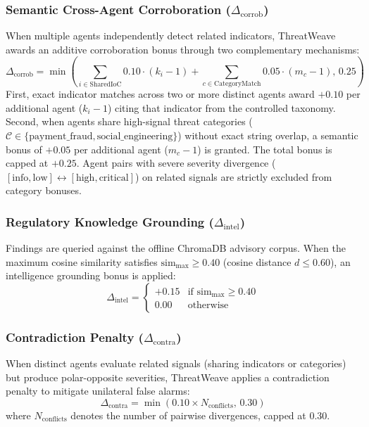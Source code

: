\documentclass[conference]{IEEEtran}
\begin{document}
\subsubsection{Semantic Cross-Agent Corroboration ($\Delta_{\text{corrob}}$)}
When multiple agents independently detect related indicators, ThreatWeave awards an additive corroboration bonus through two complementary mechanisms:
\begin{equation}
\Delta_{\text{corrob}} = \min\left( \sum_{i \in \text{SharedIoC}} 0.10 \cdot (k_i - 1) + \sum_{c \in \text{CategoryMatch}} 0.05 \cdot (m_c - 1), \, 0.25 \right)
\end{equation}
First, exact indicator matches across two or more distinct agents award $+0.10$ per additional agent ($k_i - 1$) citing that indicator from the controlled taxonomy. Second, when agents share high-signal threat categories ($\mathcal{C} \in \{\text{payment\_fraud}, \text{social\_engineering}\}$) without exact string overlap, a semantic bonus of $+0.05$ per additional agent ($m_c - 1$) is granted. The total bonus is capped at $+0.25$. Agent pairs with severe severity divergence ($[\text{info}, \text{low}] \leftrightarrow [\text{high}, \text{critical}]$) on related signals are strictly excluded from category bonuses.

\subsubsection{Regulatory Knowledge Grounding ($\Delta_{\text{intel}}$)}
Findings are queried against the offline ChromaDB advisory corpus. When the maximum cosine similarity satisfies $\text{sim}_{\max} \ge 0.40$ (cosine distance $d \le 0.60$), an intelligence grounding bonus is applied:
\begin{equation}
\Delta_{\text{intel}} = \begin{cases} +0.15 & \text{if } \text{sim}_{\max} \ge 0.40 \\ 0.00 & \text{otherwise} \end{cases}
\end{equation}

\subsubsection{Contradiction Penalty ($\Delta_{\text{contra}}$)}
When distinct agents evaluate related signals (sharing indicators or categories) but produce polar-opposite severities, ThreatWeave applies a contradiction penalty to mitigate unilateral false alarms:
\begin{equation}
\Delta_{\text{contra}} = \min\left( 0.10 \times N_{\text{conflicts}}, \, 0.30 \right)
\end{equation}
where $N_{\text{conflicts}}$ denotes the number of pairwise divergences, capped at $0.30$.
\end{document}
